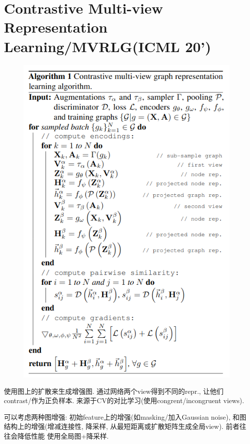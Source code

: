 \documentclass{article}
\begin{document}
\section{Contrastive Multi-view Representation Learning/MVRLG(ICML 20')}
\begin{figure}[htbp]
    \centering
    \includegraphics[width=0.6\paperwidth]{contrast-graph-alg.png}
\end{figure}
 使用图上的扩散来生成增强图. 通过网络两个view得到不同的repr., 让他们contrast/作为正负样本. 来源于CV的对比学习(使用congrent/incongruent views).

可以考虑两种图增强: 初始feature上的增强(如masking/加入Gaussian noise), 和图结构上的增强(增减连接性, 降采样, 从最短距离或扩散矩阵生成全局view). 前者往往会降低性能 \tRarr 使用全局图+降采样.
\end{document}
